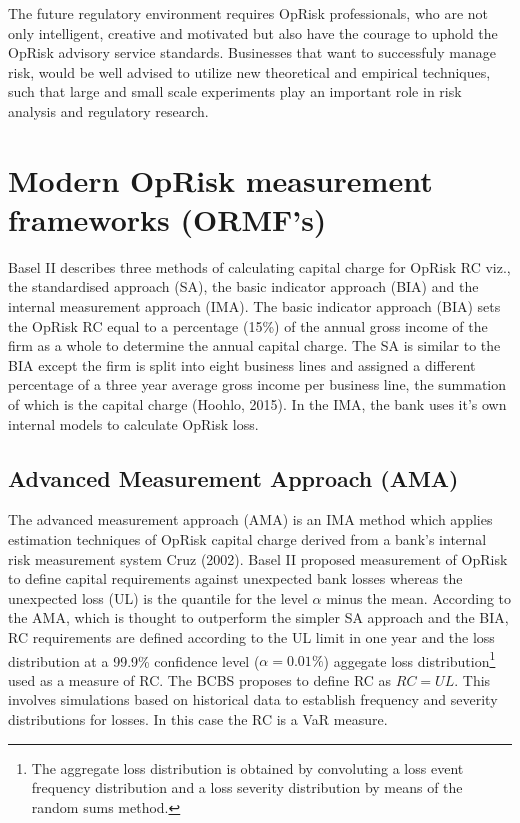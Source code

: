 \documentclass{DissertateUSU}
\begin{document}
The future regulatory environment requires OpRisk professionals, who are
not only intelligent, creative and motivated but also have the courage
to uphold the OpRisk advisory service standards. Businesses that want to
successfuly manage risk, would be well advised to utilize new
theoretical and empirical techniques, such that large and small scale
experiments play an important role in risk analysis and regulatory
research.

\section{Modern OpRisk measurement frameworks (ORMF's)}
\label{sec:modern OpRisk measurement frameworks (ORMF's)}

Basel II describes three methods of calculating capital charge for
OpRisk RC viz., the standardised approach (SA), the basic indicator
approach (BIA) and the internal measurement approach (IMA). The basic
indicator approach (BIA) sets the OpRisk RC equal to a percentage (15\%)
of the annual gross income of the firm as a whole to determine the
annual capital charge. The SA is similar to the BIA except the firm is
split into eight business lines and assigned a different percentage of a
three year average gross income per business line, the summation of
which is the capital charge (Hoohlo, 2015). In the IMA, the bank uses
it's own internal models to calculate OpRisk loss.\medskip

\subsection{Advanced Measurement Approach (AMA)}

The advanced measurement approach (AMA) is an IMA method which applies
estimation techniques of OpRisk capital charge derived from a bank's
internal risk measurement system Cruz (2002). Basel II proposed
measurement of OpRisk to define capital requirements against unexpected
bank losses whereas the unexpected loss (UL) is the quantile for the
level \(\alpha\) minus the mean. According to the AMA, which is thought
to outperform the simpler SA approach and the BIA, RC requirements are
defined according to the UL limit in one year and the loss distribution
at a 99.9\% confidence level (\(\alpha = 0.01\%\)) aggegate loss
distribution\footnote{The aggregate loss distribution is obtained by convoluting a loss event frequency distribution and a loss severity distribution by means of the random sums method.}
used as a measure of RC. The BCBS proposes to define RC as \(RC = UL\).
This involves simulations based on historical data to establish
frequency and severity distributions for losses. In this case the RC is
a VaR measure.\medskip
\end{document}

